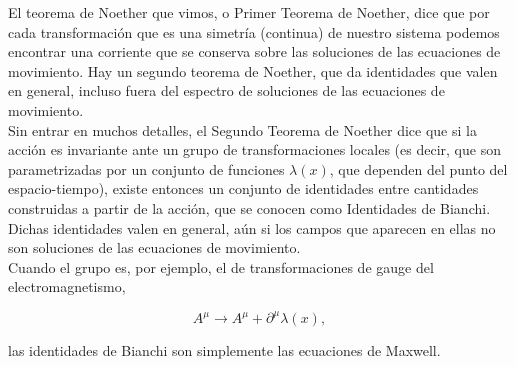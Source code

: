 El teorema de Noether que vimos, o Primer Teorema de Noether, dice que por cada transformación que es una simetría (continua) de nuestro sistema podemos encontrar una corriente que se conserva sobre las soluciones de las ecuaciones de movimiento. Hay un segundo teorema de Noether, que da identidades que valen en general, incluso fuera del espectro de soluciones de las ecuaciones de movimiento.\\

Sin entrar en muchos detalles, el Segundo Teorema de Noether dice que si la acción es invariante ante un grupo de transformaciones locales (es decir, que son parametrizadas por un conjunto de funciones $\lambda(x)$, que dependen del punto del espacio-tiempo), existe entonces un conjunto de identidades entre cantidades construidas a partir de la acción, que se conocen como Identidades de Bianchi. Dichas identidades valen en general, aún si los campos que aparecen en ellas no son soluciones de las ecuaciones de movimiento.\\
Cuando el grupo es, por ejemplo, el de transformaciones de gauge del electromagnetismo,


\begin{equation}
    A^\mu \rightarrow A^\mu+\partial^\mu \lambda(x),
\end{equation}

las identidades de Bianchi son simplemente las ecuaciones de Maxwell.










